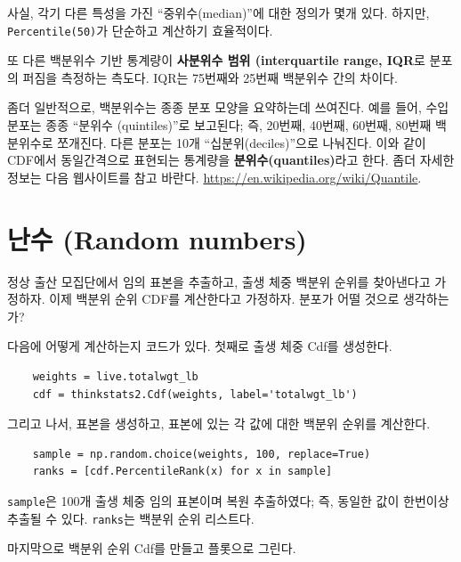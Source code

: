 사실, 각기 다른 특성을 가진 ``중위수(median)''에 대한 정의가 몇개 있다. 하지만, {\tt Percentile(50)}가 단순하고 계산하기 효율적이다.

또 다른 백분위수 기반 통계량이 {\bf 사분위수 범위 (interquartile range, IQR}로 분포의 퍼짐을 측정하는 측도다.
IQR는 75번째와 25번째 백분위수 간의 차이다.

좀더 일반적으로, 백분위수는 종종 분포 모양을 요약하는데 쓰여진다.
예를 들어, 수입 분포는 종종 ``분위수 (quintiles)''로 보고된다; 즉, 20번째, 40번째, 60번째, 80번째 백분위수로 쪼개진다.
다른 분포는 10개 ``십분위(deciles)''으로 나눠진다.
이와 같이 CDF에서 동일간격으로 표현되는 통계량을 {\bf 분위수(quantiles)}라고 한다. 좀더 자세한 정보는 다음 웹사이트를 참고 바란다. \url{https://en.wikipedia.org/wiki/Quantile}.


\section{난수 (Random numbers)}
\label{random}

정상 출산 모집단에서 임의 표본을 추출하고, 출생 체중 백분위 순위를 찾아낸다고 가정하자. 이제 백분위 순위 CDF를 계산한다고 가정하자.
분포가 어떨 것으로 생각하는가?


다음에 어떻게 계산하는지 코드가 있다. 첫째로 출생 체중 Cdf를 생성한다.

\begin{verbatim}
    weights = live.totalwgt_lb
    cdf = thinkstats2.Cdf(weights, label='totalwgt_lb')
\end{verbatim}

그리고 나서, 표본을 생성하고, 표본에 있는 각 값에 대한 백분위 순위를 계산한다.

\begin{verbatim}
    sample = np.random.choice(weights, 100, replace=True)
    ranks = [cdf.PercentileRank(x) for x in sample]
\end{verbatim}

{\tt sample}은 100개 출생 체중 임의 표본이며 복원 추출하였다;
즉, 동일한 값이 한번이상 추출될 수 있다. 
{\tt ranks}는 백분위 순위 리스트다.

마지막으로 백분위 순위 Cdf를 만들고 플롯으로 그린다.


